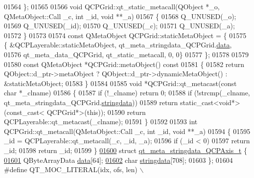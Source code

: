 \begin{DoxyCode}
01564 \};
01565 
01566 \textcolor{keywordtype}{void} QCPGrid::qt\_static\_metacall(QObject *\_o, QMetaObject::Call \_c, \textcolor{keywordtype}{int} \_id, \textcolor{keywordtype}{void} **\_a)
01567 \{
01568     Q\_UNUSED(\_o);
01569     Q\_UNUSED(\_id);
01570     Q\_UNUSED(\_c);
01571     Q\_UNUSED(\_a);
01572 \}
01573 
01574 \textcolor{keyword}{const} QMetaObject QCPGrid::staticMetaObject = \{
01575     \{ &QCPLayerable::staticMetaObject, qt\_meta\_stringdata\_QCPGrid.\hyperlink{a00016_a7e6e5bd7ca3eb3f18073d11e635e5cb9}{data},
01576       qt\_meta\_data\_QCPGrid,  qt\_static\_metacall, 0, 0\}
01577 \};
01578 
01579 
01580 \textcolor{keyword}{const} QMetaObject *QCPGrid::metaObject()\textcolor{keyword}{ const}
01581 \textcolor{keyword}{}\{
01582     \textcolor{keywordflow}{return} QObject::d\_ptr->metaObject ? QObject::d\_ptr->dynamicMetaObject() : &staticMetaObject;
01583 \}
01584 
01585 \textcolor{keywordtype}{void} *QCPGrid::qt\_metacast(\textcolor{keyword}{const} \textcolor{keywordtype}{char} *\_clname)
01586 \{
01587     \textcolor{keywordflow}{if} (!\_clname) \textcolor{keywordflow}{return} 0;
01588     \textcolor{keywordflow}{if} (!strcmp(\_clname, qt\_meta\_stringdata\_QCPGrid.\hyperlink{a00016_a0bcd248c91a252f9ad93a353181ea07e}{stringdata}))
01589         \textcolor{keywordflow}{return} \textcolor{keyword}{static\_cast<}\textcolor{keywordtype}{void}*\textcolor{keyword}{>}(\textcolor{keyword}{const\_cast<} QCPGrid*\textcolor{keyword}{>}(\textcolor{keyword}{this}));
01590     \textcolor{keywordflow}{return} QCPLayerable::qt\_metacast(\_clname);
01591 \}
01592 
01593 \textcolor{keywordtype}{int} QCPGrid::qt\_metacall(QMetaObject::Call \_c, \textcolor{keywordtype}{int} \_id, \textcolor{keywordtype}{void} **\_a)
01594 \{
01595     \_id = QCPLayerable::qt\_metacall(\_c, \_id, \_a);
01596     \textcolor{keywordflow}{if} (\_id < 0)
01597         \textcolor{keywordflow}{return} \_id;
01598     \textcolor{keywordflow}{return} \_id;
01599 \}
\hypertarget{a00016_source_l01600}{}\hyperlink{a00016}{01600} \textcolor{keyword}{struct }\hyperlink{a00016_d0/d61/a00100}{qt\_meta\_stringdata\_QCPAxis\_t} \{
\hypertarget{a00016_source_l01601}{}\hyperlink{a00016_a6de5289a2e23a98b0352a48533dedbd4}{01601}     QByteArrayData \hyperlink{a00016_a6de5289a2e23a98b0352a48533dedbd4}{data}[64];
\hypertarget{a00016_source_l01602}{}\hyperlink{a00016_a1fe440f64883a266431cf43cff1b5052}{01602}     \textcolor{keywordtype}{char} \hyperlink{a00016_a1fe440f64883a266431cf43cff1b5052}{stringdata}[708];
01603 \};
01604 \textcolor{preprocessor}{#define QT\_MOC\_LITERAL(idx, ofs, len) \(\backslash\)}

\end{DoxyCode}
